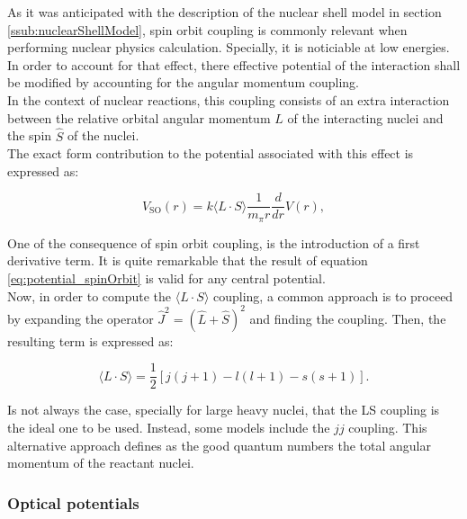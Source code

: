 \documentclass[openany]{book}
\begin{document}
As it was anticipated with the description of the nuclear shell model in section \ref{ssub:nuclearShellModel}, spin orbit coupling is commonly relevant when performing nuclear physics calculation. Specially, it is noticiable at low energies. \\

In order to account for that effect, there effective potential of the interaction shall be modified by accounting for the angular momentum coupling. \\

 In the context of nuclear reactions, this coupling consists of an extra interaction between the relative orbital angular momentum $\hat L$ of the interacting nuclei and the spin $\hat S$ of the nuclei. \\

The exact form contribution to the potential associated with this effect is expressed as:

\begin{equation}  \label{eq:potential_spinOrbit}
	V_{\mathrm{SO}}(r) = k\langle L \cdot S \rangle  \frac{1}{m_{\pi}r} \frac{d}{dr} V(r),
\end{equation}

One of the consequence of spin orbit coupling, is the introduction of a first derivative term. It is quite remarkable that the result of equation \ref{eq:potential_spinOrbit} is valid for any central potential.  \\

Now, in order to compute the   $  \langle L \cdot S \rangle$ coupling, a common approach is to proceed by expanding the operator  $\hat J^2 = (\hat L + \hat S)^2$ and finding the coupling. Then, the resulting term is expressed as: 

\begin{equation}  \label{eq:potential_spinOrbit_LSexpansion}
	\langle L \cdot S \rangle =  \frac{1}{2}[j(j+1) - l(l+1) - s(s+1)].
\end{equation}

Is not always the case, specially for large heavy nuclei, that the LS coupling is the ideal one to be used. Instead, some models include the $jj$ coupling. This alternative approach defines as the good quantum numbers the total angular momentum of the reactant nuclei.

\subsubsection{Optical potentials} \label{sub:potential_effective_optical}
\end{document}
